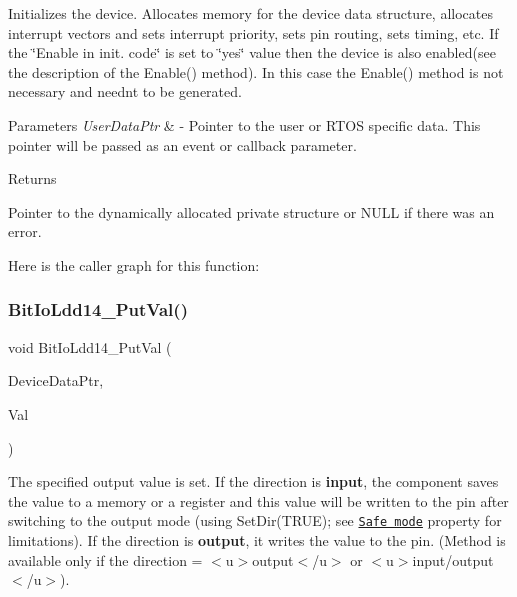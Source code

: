 Initializes the device. Allocates memory for the device data structure, allocates interrupt vectors and sets interrupt priority, sets pin routing, sets timing, etc. If the \char`\"{}\+Enable
    in init. code\char`\"{} is set to \char`\"{}yes\char`\"{} value then the device is also enabled(see the description of the Enable() method). In this case the Enable() method is not necessary and needn\textquotesingle{}t to be generated. 


\begin{DoxyParams}{Parameters}
{\em User\+Data\+Ptr} & -\/ Pointer to the user or R\+T\+OS specific data. This pointer will be passed as an event or callback parameter. \\
\hline
\end{DoxyParams}
\begin{DoxyReturn}{Returns}

\begin{DoxyItemize}
\item Pointer to the dynamically allocated private structure or N\+U\+LL if there was an error. 
\end{DoxyItemize}
\end{DoxyReturn}
Here is the caller graph for this function\+:
\mbox{\label{group___bit_io_ldd14__module_ga5b43e570ab8bb71e3fb5dcbfdfb5f5f6}} 
\subsubsection{\texorpdfstring{Bit\+Io\+Ldd14\+\_\+\+Put\+Val()}{BitIoLdd14\_PutVal()}}
{\footnotesize\ttfamily void Bit\+Io\+Ldd14\+\_\+\+Put\+Val (\begin{DoxyParamCaption}\item[{\hyperlink{group___p_e___types__module_gac5cf1362f1f0e3a2ce71b1bf2276d091}{L\+D\+D\+\_\+\+T\+Device\+Data} $\ast$}]{Device\+Data\+Ptr,  }\item[{\hyperlink{group___p_e___types__module_ga97a80ca1602ebf2303258971a2c938e2}{bool}}]{Val }\end{DoxyParamCaption})}



The specified output value is set. If the direction is {\bfseries  input}, the component saves the value to a memory or a register and this value will be written to the pin after switching to the output mode (using {\ttfamily Set\+Dir(\+T\+R\+U\+E)}; see \href{BitIOProperties.html#SafeMode}{\tt Safe mode} property for limitations). If the direction is {\bfseries output}, it writes the value to the pin. (Method is available only if the direction = $<$u$>${\ttfamily output}$<$/u$>$ or $<$u$>${\ttfamily  input/output}$<$/u$>$). 


